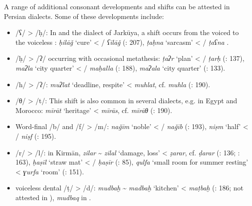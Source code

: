 \documentclass[output=paper]{langsci/langscibook}
\begin{document}
A range of additional consonant developments and shifts can be attested in Persian dialects. Some of these developments include:

\begin{itemize}
\item[]
/ʕ/ > /ḥ/: In  and the dialect of Jarkūya, a shift occurs from the voiced to the voiceless : \textit{ḥilāǧ} ‘cure’ < / \textit{ʕilāǧ} (\citealt{Īzadpanāh2001}: 207), \textit{ṭaḥna} ‘sarcasm’ < / \textit{ṭaʕna} \citep{Borjian2008}.

\item[]
/ḥ/ > /ʔ/ occurring with occasional metathesis: \textit{ṭaʔr} ‘plan’ < / \textit{ṭarḥ} (\citealt{Ṣarrāfī1996}: 137), \textit{maʔla} ‘city quarter’ < / \textit{maḥalla} (\citealt{Ṣarrāfī1996}: 188), \textit{maʔala} ‘city quarter’ (\citealt{NaǧībiFīni2002}: 133).

\item[]
/h/ > /ʔ/: \textit{muʔlat} ‘deadline, respite’ <  \textit{muhlat}, cf.  \textit{muhla} (\citealt{Ṣarrāfī1996}: 190).

\item[]
/θ/ > /t/: This shift is also common in several  dialects, e.g. in Egypt and Morocco: \textit{mīrāt} ‘heritage’ <  \textit{mīrās}, cf.  \textit{mīrāθ} (\citealt{Īzadpanāh2001}: 190).

\item[]
Word-final /b/ and /f/ > /m/: \textit{naǧīm} ‘noble’ < / \textit{naǧīb} (\citealt{Īzadpanāh2001}: 193), \textit{niṣm} ‘half’ < / \textit{niṣf} (\citealt{Īzadpanāh2001}: 195).

\item[]
/r/ > /l/: in Kirmān, \textit{zilar} \~{} \textit{zilal} ‘damage, loss’ <  \textit{ẓarar}, cf.  \textit{ḍarar} (\citealt{Ṣarrāfī1996}: 136; \citealt{Dānišgar1995}: 163), \textit{ḥaṣīl} ‘straw mat’ < / \textit{ḥaṣīr} (\citealt{Ṣarrāfī1996}: 85), \textit{qulfa} ‘small room for summer resting’ <  \textit{ɣurfa} ‘room’ (\citealt{Fāẓilī2004}: 151).

\item[]
 voiceless dental  /ṭ/ > /d/: \textit{mudbaḫ} \~{} \textit{madbaḫ} ‘kitchen’ <  \textit{maṭbaḫ} (\citealt{Ṣarrāfī1996}: 186; not attested in ), \textit{mudbaq} in  \citep[251]{Sarlak2002}.


\end{itemize}
\end{document}

